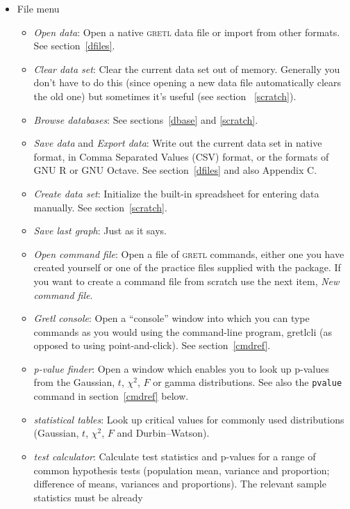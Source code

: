 \documentclass{article}
\begin{document}
\begin{itemize}
\item \textsf{File menu} 
  \begin{itemize}
  \item \textit{Open data}: Open a native \textsc{gretl} data file or
    import from other formats.  See section~\ref{dfiles}.
  \item \textit{Clear data set}: Clear the current data set out of
    memory.  Generally you don't have to do this (since opening a new
    data file automatically clears the old one) but sometimes it's
    useful (see section ~\ref{scratch}).
  \item \textit{Browse databases}: See sections~\ref{dbase} and
    \ref{scratch}.
  \item \textit{Save data} and \textit{Export data}: Write out the
    current data set in native format, in Comma Separated Values (CSV)
    format, or the formats of GNU R or GNU Octave.  See
    section~\ref{dfiles} and also Appendix C.
  \item \textit{Create data set}: Initialize the built-in spreadsheet
    for entering data manually.  See section~\ref{scratch}.
  \item \textit{Save last graph}: Just as it says.
  \item \textit{Open command file}: Open a file of \textsc{gretl}
    commands, either one you have created yourself or one of the
    practice files supplied with the package.  If you want to create a
    command file from scratch use the next item, \textit{New command
      file}.
  \item \textit{Gretl console}: Open a ``console'' window into which
    you can type commands as you would using the command-line program,
    \textsf{gretlcli} (as opposed to using point-and-click). See
    section~\ref{cmdref}. 
  \item \textit{p-value finder}: Open a window which enables you to
    look up p-values from the Gaussian, $t$, $\chi^2$, $F$ or gamma
    distributions.  See also the \texttt{pvalue} command in
    section~\ref{cmdref} below. 
  \item \textit{statistical tables}: Look up critical values for
    commonly used distributions (Gaussian, $t$, $\chi^2$, $F$ and
    Durbin--Watson).  
  \item \textit{test calculator}: Calculate test statistics and
    p-values for a range of common hypothesis tests (population mean,
    variance and proportion; difference of means, variances and
    proportions).  The relevant sample statistics must be already

\end{itemize}
\end{itemize}
\end{document}
